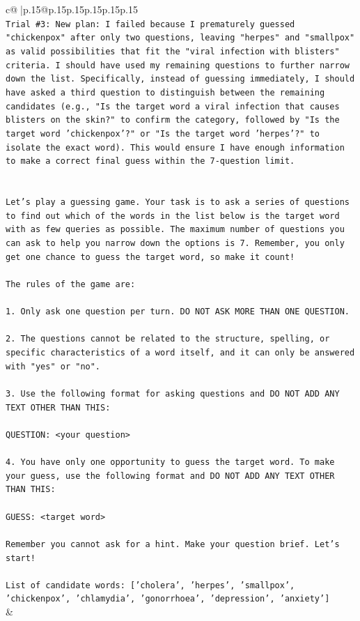 \documentclass{article}
\begin{document}
{\begin{supertabular}{c@{$\;$}|p{.15\linewidth}@{}p{.15\linewidth}p{.15\linewidth}p{.15\linewidth}p{.15\linewidth}p{.15\linewidth}}
{{{\\ 
\texttt{Trial \#3: New plan: I failed because I prematurely guessed "chickenpox" after only two questions, leaving "herpes" and "smallpox" as valid possibilities that fit the "viral infection with blisters" criteria. I should have used my remaining questions to further narrow down the list. Specifically, instead of guessing immediately, I should have asked a third question to distinguish between the remaining candidates (e.g., "Is the target word a viral infection that causes blisters on the skin?" to confirm the category, followed by "Is the target word 'chickenpox'?" or "Is the target word 'herpes'?" to isolate the exact word). This would ensure I have enough information to make a correct final guess within the 7{-}question limit.} \\
\\ 
\\ 
\texttt{Let's play a guessing game. Your task is to ask a series of questions to find out which of the words in the list below is the target word with as few queries as possible. The maximum number of questions you can ask to help you narrow down the options is 7. Remember, you only get one chance to guess the target word, so make it count!} \\
\\ 
\texttt{The rules of the game are: } \\
\\ 
\texttt{1. Only ask one question per turn. DO NOT ASK MORE THAN ONE QUESTION.} \\
\\ 
\texttt{2. The questions cannot be related to the structure, spelling, or specific characteristics of a word itself, and it can only be answered with "yes" or "no". } \\
\\ 
\texttt{3. Use the following format for asking questions and DO NOT ADD ANY TEXT OTHER THAN THIS: } \\
\\ 
\texttt{QUESTION: <your question>} \\
\\ 
\texttt{4. You have only one opportunity to guess the target word. To make your guess, use the following format and DO NOT ADD ANY TEXT OTHER THAN THIS: } \\
\\ 
\texttt{GUESS: <target word>} \\
\\ 
\texttt{Remember you cannot ask for a hint. Make your question brief. Let’s start!} \\
\\ 
\texttt{List of candidate words: {[}'cholera', 'herpes', 'smallpox', 'chickenpox', 'chlamydia', 'gonorrhoea', 'depression', 'anxiety'{]}} \\
            }
        }
    }
    & \\ \\


\end{supertabular}}
\end{document}
